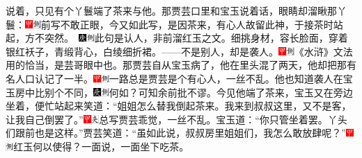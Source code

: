 说着，只见有个丫鬟端了茶来与他。那贾芸口里和宝玉说着话，眼睛却溜瞅那丫鬟：{\includegraphics[width=3mm]{../Images/00002}\includegraphics[width=3mm]{../Images/00011}\footnotesize \kaishu 前写不敢正眼，今又如此写，是因茶来，有心人故留此神，于接茶时站起，方不突然。　\includegraphics[width=3mm]{../Images/00004}\includegraphics[width=3mm]{../Images/00011}\footnotesize \kaishu 此句是认人，非前溜红玉之文。}细挑身材，容长脸面，穿着银红袄子，青缎背心，白绫细折裙。------不是别人，却是袭人。{\includegraphics[width=3mm]{../Images/00002}\includegraphics[width=3mm]{../Images/00011}\footnotesize \kaishu 《水浒》文法用的恰当，是芸哥眼中也。}那贾芸自从宝玉病了，他在里头混了两天，他却把那有名人口认记了一半。{\includegraphics[width=3mm]{../Images/00002}\includegraphics[width=3mm]{../Images/00011}\footnotesize \kaishu 一路总是贾芸是个有心人，一丝不乱。}他也知道袭人在宝玉房中比别个不同，{\includegraphics[width=3mm]{../Images/00004}\includegraphics[width=3mm]{../Images/00011}\footnotesize \kaishu 何如？可知余前批不谬。}今见他端了茶来，宝玉又在旁边坐着，便忙站起来笑道：``姐姐怎么替我倒起茶来。我来到叔叔这里，又不是客，让我自己倒罢了。''{\includegraphics[width=3mm]{../Images/00002}\includegraphics[width=3mm]{../Images/00012}\footnotesize \kaishu 总写贾芸乖觉，一丝不乱。}宝玉道：``你只管坐着罢。丫头们跟前也是这样。''贾芸笑道：``虽如此说，叔叔房里姐姐们，我怎么敢放肆呢？''{\includegraphics[width=3mm]{../Images/00002}\includegraphics[width=3mm]{../Images/00011}\footnotesize \kaishu 红玉何以使得？}一面说，一面坐下吃茶。

